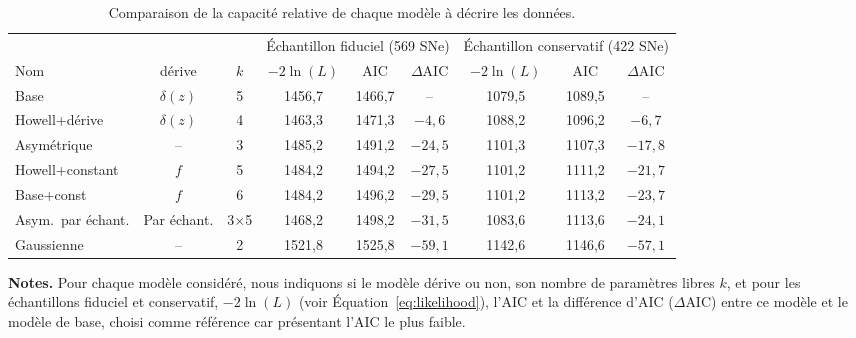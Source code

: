 \documentclass[../main/main.tex]{subfiles}
\begin{document}
\begin{table}[ht]
    \centerfloat
    \begin{threeparttable}
        \caption[Comparaison de la capacité relative de chaque modèle à décrire
        les données par rapport au modèle de base]{Comparaison de la
            capacité relative de chaque modèle à décrire les données.}
            \label{tab:comp}
        \begin{tabular}{lcccccccc}
            \toprule
            & & & \multicolumn{3}{c}{Échantillon fiduciel (569 SNe)}
                & \multicolumn{3}{c}{Échantillon conservatif (422 SNe)} \\
            \cmidrule(lr){4-6} \cmidrule(lr){7-9}
            Nom & dérive & $k$ &
            $-2\ln(L)$ & AIC & $\Delta$AIC & $-2\ln(L)$ & AIC & $\Delta$AIC\\
            \midrule
            Base & $\delta(z)$ & 5
            & 1456,7 & 1466,7 & -- 
            & 1079,5 & 1089,5 & -- \\
            Howell+dérive & $\delta(z)$ & 4
            & 1463,3 & 1471,3 & $-4,6$
            & 1088,2 & 1096,2 & $-6,7$ 
            \\
            Asymétrique & -- & 3
            & 1485,2 & 1491,2 & $-24,5$
            & 1101,3 & 1107,3 & $-17,8$ 
            \\
            Howell+constant & $f$ & 5
            & 1484,2 & 1494,2 & $-27,5$
            & 1101,2 & 1111,2 & $-21,7$ 
            \\
            Base+const & $f$ & 6
            & 1484,2 & 1496,2 & $-29,5$
            & 1101,2 & 1113,2 & $-23,7$ 
            \\
            Asym.\ par échant. & Par échant. & 3$\times$5
            & 1468,2 & 1498,2  & $-31,5$
            & 1083,6 & 1113,6  & $-24,1$ 
            \\
            Gaussienne & -- & 2
            & 1521,8 & 1525,8 & $-59,1$
            & 1142,6 & 1146,6 & $-57,1$ 
            \\
            \bottomrule
        \end{tabular}
        \begin{tablenotes}[flushleft]
            \item\small \textbf{\hspace{-3.2pt}Notes.} Pour chaque modèle considéré,
                nous indiquons si le modèle dérive ou non, son nombre de
                paramètres libres $k$, et pour les échantillons fiduciel et
                conservatif, $-2\ln(L)$ (voir Équation~\ref{eq:likelihood}),
                l'AIC et la différence d'AIC ($\Delta$AIC) entre ce modèle et le
                modèle de base, choisi comme référence car présentant l'AIC le
                plus faible.
        \end{tablenotes}
    \end{threeparttable}
\end{table}
\end{document}
